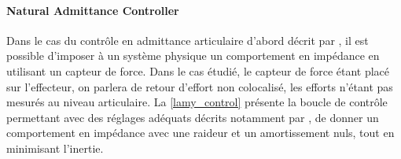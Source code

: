 \documentclass[12pt, a4paper]{article} %
\numberwithin{equation}{section}
\begin{document}
\paragraph{Natural Admittance Controller} \label{sec_robot_sub_ctrl_loop_sub_joint_par_NAC}

Dans le cas du contrôle en admittance articulaire d'abord décrit par \cite{newman_stability_1992}, il est possible d'imposer à un système physique un comportement en impédance en utilisant un capteur de force. Dans le cas étudié, le capteur de force étant placé sur l'effecteur, on parlera de retour d'effort non colocalisé, les efforts n'étant pas mesurés au niveau articulaire. La \cref{lamy_control} présente la boucle de contrôle permettant avec des réglages adéquats décrits notamment par \cite{Lamy_achieving_2009}, de donner un comportement en impédance avec une raideur et un amortissement nuls, tout en minimisant l'inertie. 
%
\newlineBlank
%

\end{document}
